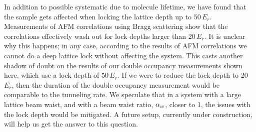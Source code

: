 In addition to possible systematic due to molecule lifetime, we have found that
the sample gets affected when locking the lattice depth up to 50\,$E_{r}$.
Measurements of AFM correlations using Bragg scattering show that the
correlations effectively wash out for lock depths larger than $20\,E_{r}$.  It
is unclear why this happens;  in any case,  according to the results of AFM
correlations we cannot do a deep lattice lock without affecting the system.
This casts another shadow of doubt on the results of our double occupancy
measurements shown here, which use a lock depth of $50\,E_{r}$.   If we were to
reduce the lock depth to 20\,$E_{r}$, then the duration of the double occupancy
measurement would be comparable to the tunneling rate.    We speculate that in
a system with a large lattice beam waist, and with a beam waist ratio,
$ \alpha_{w} $, closer to 1, the issues with the lock depth would be mitigated.  A
future setup, currently under construction, will help us get the answer to this
question. 





